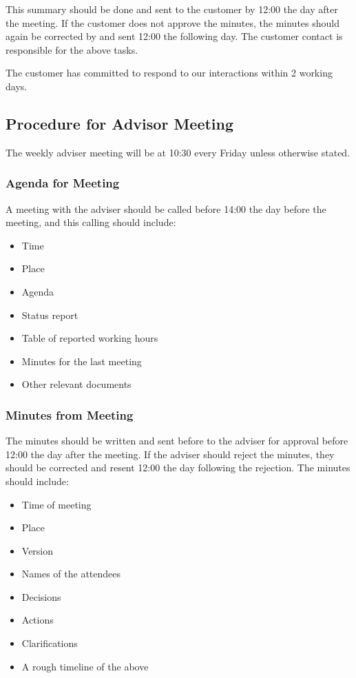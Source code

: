This summary should be done and sent to the customer by 12:00 the day after the meeting. If the customer does not approve the minutes, the minutes should again be corrected by and sent 12:00 the following day. The customer contact is responsible for the above tasks.

The customer has committed to respond to our interactions within 2 working days.

\subsection{Procedure for Advisor Meeting}
The weekly adviser meeting will be at 10:30 every Friday unless otherwise stated.

\subsubsection{Agenda for Meeting}
A meeting with the adviser should be called before 14:00 the day before the meeting, and this calling should include:
\begin{itemize}
	\item Time
	\item Place
	\item Agenda
	\item Status report
	\item Table of reported working hours
	\item Minutes for the last meeting
	\item Other relevant documents
\end{itemize}

\subsubsection{Minutes from Meeting}
The minutes should be written and sent before to the adviser for approval before 12:00 the day after the meeting. If the adviser should reject the minutes, they should be corrected and resent 12:00 the day following the rejection. The minutes should include:
\begin{itemize}
	\item Time of meeting
	\item Place
	\item Version
	\item Names of the attendees
	\item Decisions
	\item Actions
	\item Clarifications
	\item A rough timeline of the above
\end{itemize}

